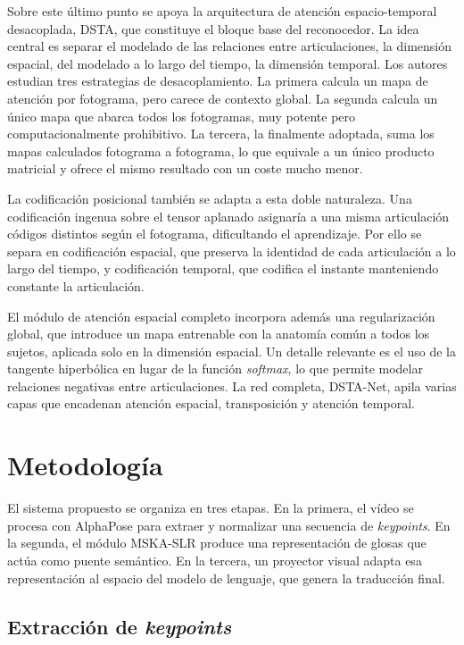 \documentclass[11pt]{article}
\begin{document}
Sobre este último punto se apoya la arquitectura de atención espacio-temporal desacoplada, DSTA, que constituye el bloque base del reconocedor. La idea central es separar el modelado de las relaciones entre articulaciones, la dimensión espacial, del modelado a lo largo del tiempo, la dimensión temporal. Los autores estudian tres estrategias de desacoplamiento. La primera calcula un mapa de atención por fotograma, pero carece de contexto global. La segunda calcula un único mapa que abarca todos los fotogramas, muy potente pero computacionalmente prohibitivo. La tercera, la finalmente adoptada, suma los mapas calculados fotograma a fotograma, lo que equivale a un único producto matricial y ofrece el mismo resultado con un coste mucho menor.

La codificación posicional también se adapta a esta doble naturaleza. Una codificación ingenua sobre el tensor aplanado asignaría a una misma articulación códigos distintos según el fotograma, dificultando el aprendizaje. Por ello se separa en codificación espacial, que preserva la identidad de cada articulación a lo largo del tiempo, y codificación temporal, que codifica el instante manteniendo constante la articulación.

El módulo de atención espacial completo incorpora además una regularización global, que introduce un mapa entrenable con la anatomía común a todos los sujetos, aplicada solo en la dimensión espacial. Un detalle relevante es el uso de la tangente hiperbólica en lugar de la función \textit{softmax}, lo que permite modelar relaciones negativas entre articulaciones. La red completa, DSTA-Net, apila varias capas que encadenan atención espacial, transposición y atención temporal.

\section{Metodología}

El sistema propuesto se organiza en tres etapas. En la primera, el vídeo se procesa con AlphaPose para extraer y normalizar una secuencia de \textit{keypoints}. En la segunda, el módulo MSKA-SLR produce una representación de glosas que actúa como puente semántico. En la tercera, un proyector visual adapta esa representación al espacio del modelo de lenguaje, que genera la traducción final.

\subsection{Extracción de \textit{keypoints}}
\end{document}
